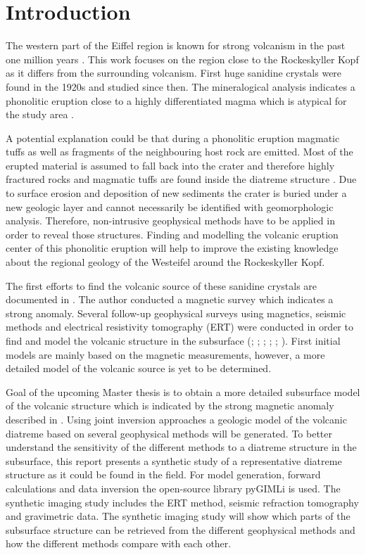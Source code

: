 \section{Introduction}\label{section:Introduction}
The western part of the Eiffel region is known for strong volcanism in the past one million years \citep{schmincke2009vulkane}. This work focuses on the region close to the Rockeskyller Kopf as it differs from the surrounding volcanism. First huge sanidine crystals were found in the 1920s \citep{hopmann1914spuren} and studied since then. The mineralogical analysis indicates a phonolitic eruption close to a highly differentiated magma which is atypical for the study area \citep{MarcBoxberg.2011}. 

A potential explanation could be that during a phonolitic eruption magmatic tuffs as well as fragments of the neighbouring host rock are emitted. Most of the erupted material is assumed to fall back into the crater and therefore highly fractured rocks and magmatic tuffs are found inside the diatreme structure \citep{white2011maar}. Due to surface erosion and deposition of new sediments the crater is buried under a new geologic layer and cannot necessarily be identified with geomorphologic analysis. Therefore, non-intrusive geophysical methods have to be applied in order to reveal those structures. Finding and modelling the volcanic eruption center of this phonolitic eruption will help to improve the existing knowledge about the regional geology of the Westeifel around the Rockeskyller Kopf. 

The first efforts to find the volcanic source of these sanidine crystals are documented in \citet{mertes1983aufbau}. The author conducted a magnetic survey which indicates a strong anomaly. Several follow-up geophysical surveys using magnetics, seismic methods and electrical resistivity tomography (ERT) were conducted in order to find and model the volcanic structure in the subsurface (\cite{MarcBoxberg.2011}; \cite{HannahMues.2013}; \cite{NiklasPlumpe.2015}; \cite{NadineHauburg.2016}; \cite{DanielSchneider.2017}; \cite{TimGilberti.2020}). First initial models are mainly based on the magnetic measurements, however, a more detailed model of the volcanic source is yet to be determined. 

Goal of the upcoming Master thesis is to obtain a more detailed subsurface model of the volcanic structure which is indicated by the strong magnetic anomaly described in \citet{mertes1983aufbau,MarcBoxberg.2011}. Using joint inversion approaches a geologic model of the volcanic diatreme based on several geophysical methods will be generated. To better understand the sensitivity of the different methods to a diatreme structure in the subsurface, this report presents a synthetic study of a representative diatreme structure as it could be found in the field. For model generation, forward calculations and data inversion the open-source library pyGIMLi \citep{Ruecker2017} is used. The synthetic imaging study includes the ERT method, seismic refraction tomography and gravimetric data. The synthetic imaging study will show which parts of the subsurface structure can be retrieved from the different geophysical methods and how the different methods compare with each other.

